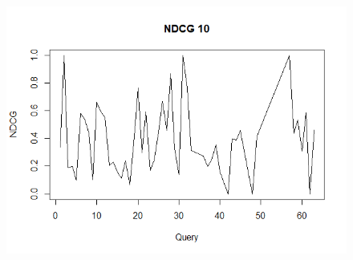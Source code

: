 \documentclass[letterpaper,12pt]{article}
\begin{document}
\begin{figure}
  \includegraphics[width=\linewidth]{85ndcg10.PNG}
  \label{fig:CACM ndcg 10}
\end{figure}
\end{document}

